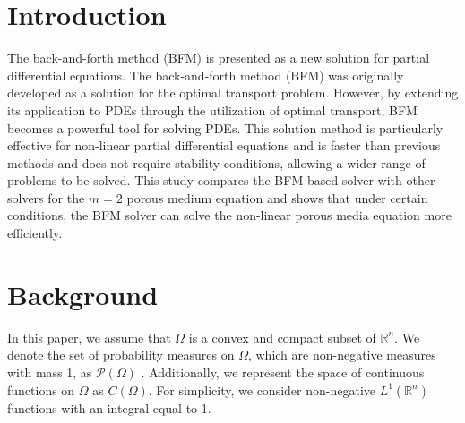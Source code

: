 \documentclass[a4,10.5pt, twocolumn, dvipdfmx]{article}
\theoremstyle{definition}
\begin{document}


\section{Introduction}
The back-and-forth method (BFM) is presented as a new solution for partial differential equations\cite{MR4238775}. 
The back-and-forth method (BFM) was originally developed as a solution for the optimal transport problem. 
However, by extending its application to PDEs through the utilization of optimal transport, 
BFM becomes a powerful tool for solving PDEs.
This solution method is particularly effective for non-linear partial differential equations and is faster than previous methods and does not require stability conditions, 
allowing a wider range of problems to be solved.
This study compares the BFM-based solver with other solvers for the $m=2$ porous medium equation and shows that under certain conditions, the BFM solver can solve the non-linear porous media equation more efficiently.
\section{Background}
In this paper, we assume that $\Omega$ is a convex and compact subset of $\mathbb{R}^n$. 
We denote the set of probability measures on $\Omega$, which are non-negative measures with mass 1, as $\mathcal{P} (\Omega)$ . 
Additionally, we represent the space of continuous functions on $\Omega$ as $C(\Omega)$. 
For simplicity, we consider non-negative \(L^1(\mathbb{R}^n)\) functions with an integral equal to 1.
\end{document}
